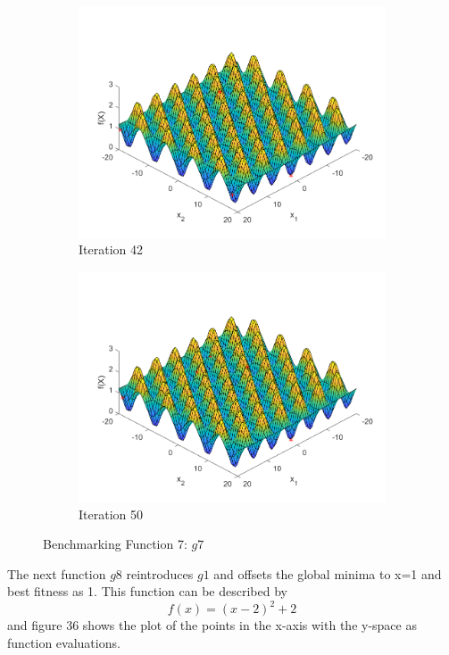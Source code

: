 \begin{figure}
\begin{subfigure}[b]{0.4\textwidth}
   \includegraphics[width=\textwidth]{img/smpl/grwnk2d/loa-iter-42}
   \caption{Iteration 42}
   \label{fig:s7-iter-6}
 \end{subfigure}
 \begin{subfigure}[b]{0.4\textwidth}
   \includegraphics[width=\textwidth]{img/smpl/grwnk2d/loa-iter-50}
   \caption{Iteration 50}
   \label{fig:s7-iter-7}
 \end{subfigure}
 \caption{Benchmarking Function 7: $g7$}
\end{figure}

\par The next function $g8$ reintroduces $g1$ and offsets the global minima to x=1 and best fitness as 1. This function can be described by
$$
f(x) = (x-2)^2 + 2
$$
and figure 36 shows the plot of the points in the x-axis with the y-space as function evaluations.

